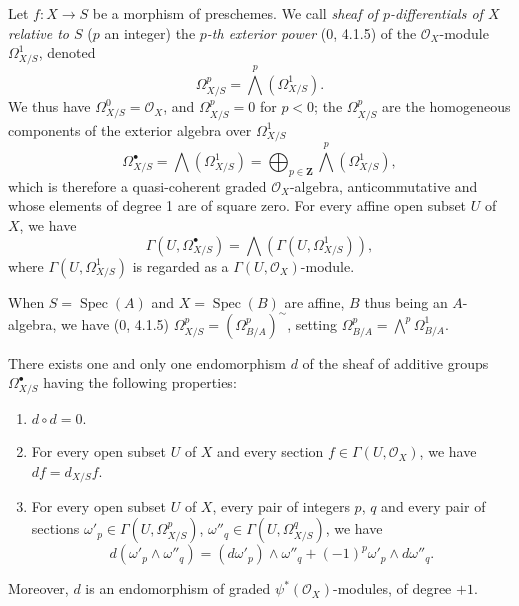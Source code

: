 \begin{env}[16.6.1]\label{IV.16.6.1}
Let $f:X\to S$ be a morphism of preschemes. We call \emph{sheaf of
$p$-differentials of $X$ relative to $S$} ($p$ an integer) the
\emph{$p$-th exterior power} (0, 4.1.5) of the $\mathcal{O}_X$-module
$\Omega_{X/S}^1$, denoted
\[
  \Omega_{X/S}^p=\bigwedge^p(\Omega_{X/S}^1).
  \tag{16.6.1.1}
  \label{IV.16.6.1.1}
\]
We thus have $\Omega_{X/S}^0=\mathcal{O}_X$, and $\Omega_{X/S}^p=0$ for $p<0$;
the $\Omega_{X/S}^p$ are the homogeneous components of the exterior algebra
over $\Omega_{X/S}^1$
\[
  \Omega_{X/S}^{\bullet}=\bigwedge(\Omega_{X/S}^1)
  =\bigoplus_{p\in\mathbf{Z}}\bigwedge^p(\Omega_{X/S}^1),
  \tag{16.6.1.2}
  \label{IV.16.6.1.2}
\]
which is therefore a quasi-coherent graded $\mathcal{O}_X$-algebra,
anticommutative and whose elements of degree 1 are of square zero. For every
affine open subset $U$ of $X$, we have
\[
  \Gamma(U,\Omega_{X/S}^{\bullet})
  =\bigwedge(\Gamma(U,\Omega_{X/S}^1)),
\]
where $\Gamma(U,\Omega_{X/S}^1)$ is regarded as a
$\Gamma(U,\mathcal{O}_X)$-module.

When $S=\operatorname{Spec}(A)$ and $X=\operatorname{Spec}(B)$ are
affine, $B$ thus being an $A$-algebra, we have (0, 4.1.5)
$\Omega_{X/S}^p=(\Omega_{B/A}^p)^{\sim}$, setting
$\Omega_{B/A}^p=\bigwedge^p\Omega_{B/A}^1$.
\end{env}

\begin{theorem}[16.6.2]
\label{IV.16.6.2}
There exists one and only one endomorphism $d$ of the sheaf of additive groups
$\Omega_{X/S}^{\bullet}$ having the following properties:
\begin{enumerate}
\item[(i)] $d\circ d=0$.
\item[(ii)] For every open subset $U$ of $X$ and every section
$f\in\Gamma(U,\mathcal{O}_X)$, we have $df=d_{X/S}f$.
\item[(iii)] For every open subset $U$ of $X$, every pair of integers $p$, $q$
and every pair of sections
$\omega'_p\in\Gamma(U,\Omega_{X/S}^p)$,
$\omega''_q\in\Gamma(U,\Omega_{X/S}^q)$, we have
\[
  d(\omega'_p\wedge\omega''_q)
  =(d\omega'_p)\wedge\omega''_q
  +(-1)^p\omega'_p\wedge d\omega''_q.
  \tag{16.6.2.1}
  \label{IV.16.6.2.1}
\]
\end{enumerate}
Moreover, $d$ is an endomorphism of graded $\psi^*(\mathcal{O}_X)$-modules,
of degree $+1$.
\end{theorem}


